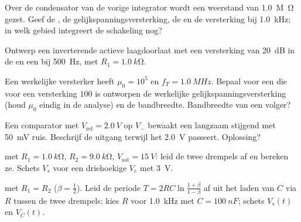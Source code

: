 \begin{exercise}[$\star\star$]\label{exo:b1:operational-amplifier:7}
Over de condensator van de vorige integrator wordt een weerstand van \qty{1.0}{M\ohm}
gezet. Geef de , de gelijkspanningsversterking, de
 en de versterking bij \qty{1.0}{kHz}; in welk gebied
integreert de schakeling nog?
\end{exercise}

\begin{exercise}[$\star\star$]\label{exo:b1:operational-amplifier:8}
Ontwerp een inverterende actieve laagdoorlaat met een versterking van \qty{20}{dB} in de
 en een  bij \qty{500}{Hz}, met $R_1 = \qty{1.0}{k\ohm}$.
\end{exercise}

\begin{exercise}[$\star\star$]\label{exo:b1:operational-amplifier:9}
Een werkelijke versterker heeft $\mu_0 = 10^5$ en $f_T = \qty{1.0}{MHz}$. Bepaal voor een
 die voor een versterking $100$ is ontworpen de
werkelijke gelijkspanningsversterking (houd $\mu_0$ eindig in de analyse) en de bandbreedte. Bandbreedte van een
volger?
\end{exercise}

\begin{exercise}[$\star\star\star$]\label{exo:b1:operational-amplifier:10}
Een comparator met $V_{\mathrm{ref}} = \qty{2.0}{V}$ op $V_-$ bewaakt een
langzaam stijgend  met \qty{50}{mV} ruis. Beschrijf de uitgang
terwijl het  \qty{2.0}{V} passeert. Oplossing?
\end{exercise}

\begin{exercise}[$\star\star\star$]\label{exo:b1:operational-amplifier:11}
 met $R_1 = \qty{1.0}{k\ohm}$, $R_2 = \qty{9.0}{k\ohm}$,
$V_{\mathrm{sat}} = \qty{15}{V}$: leid de twee drempels af en bereken ze.
Schets $V_s$ voor een driehoekige $V_e$ met  \qty{3}{V}.
\end{exercise}

\begin{exercise}[$\star\star\star$]\label{exo:b1:operational-amplifier:12}
 met $R_1 = R_2$ ($\beta = \tfrac12$). Leid de
periode $T = 2RC\ln\frac{1 + \beta}{1 - \beta}$ af uit het laden van $C$
via $R$ tussen de twee drempels; kies $R$ voor \qty{1.0}{kHz}
met $C = \qty{100}{nF}$; schets $V_s(t)$ en $V_C(t)$.
\end{exercise}

